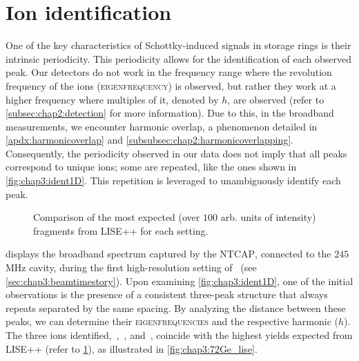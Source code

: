 \section{Ion identification}\label{sec:chap3:identification}
One of the key characteristics of Schottky-induced signals in storage rings is their intrinsic periodicity. 
This periodicity allows for the identification of each observed peak. Our detectors do not work in the frequency range where the revolution frequency of the ions (\textsc{eigenfrequency}) is observed, but rather they work at a higher frequency where multiples of it, denoted by $h$, are observed (refer to \cref{subsec:chap2:detection} for more information).
Due to this, in the broadband measurements, we encounter harmonic overlap, a phenomenon detailed in \cref{apdx:harmonicoverlap} and \cref{subsubsec:chap2:harmonicoverlapping}. Consequently, the periodicity observed in our data does not imply that all peaks correspond to unique ions; some are repeated, like the ones shown in \cref{fig:chap3:ident1D}. This repetition is leveraged to unambiguously identify each peak.
\begin{figure}[hbt] %
  \centering
  \vspace{0.5cm}
  \caption{Comparison of the most expected (over $100$ arb. units of intensity) fragments from \textsc{LISE++} for each setting.}
  \label{fig:chap3:expectedfragments}
\end{figure}
 displays the broadband spectrum captured by the \textsc{NTCAP}, connected to the $245$\,MHz cavity, during the first high-resolution setting of \, (see \cref{sec:chap3:beamtimestory}). 
Upon examining \cref{fig:chap3:ident1D}, one of the initial observations is the presence of a consistent three-peak structure that always repeats separated by the same spacing.
By analyzing the distance between these peaks, we can determine their \textsc{eigenfrequencies} and the respective harmonic ($h$). The three ions identified, \,, \,, and \,, coincide with the highest yields expected from \textsc{LISE++} (refer to \cref{fig:chap3:expectedfragments}), as illustrated in \cref{fig:chap3:72Ge_lise}.
